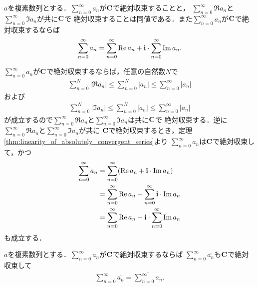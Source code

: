 	\begin{screen}
		\begin{thm}
		\label{thm:absolutely_convergent_series_is_sum_of_series_of_real_and_imaginary_part}
			$a$を複素数列とする．$\sum_{n=0}^\infty a_n$が$\mathbf{C}$で絶対収束することと，
			$\sum_{n=0}^\infty \Re{a_n}$と$\sum_{n=0}^\infty \Im{a_n}$が共に$\mathbf{C}$で
			絶対収束することは同値である．また$\sum_{n=0}^\infty a_n$が$\mathbf{C}$で絶対収束するならば
			\begin{align}
				\sum_{n=0}^\infty a_n = \sum_{n=0}^\infty \operatorname{Re} a_n + \mathbf{i} \cdot \sum_{n=0}^\infty \operatorname{Im} a_n.
			\end{align}
		\end{thm}
	\end{screen}
	
	\begin{sketch}
		$\sum_{n=0}^\infty a_n$が$\mathbf{C}$で絶対収束するならば，任意の自然数$N$で
		\begin{align}
			\sum_{n=0}^N |\Re{a_n}|
			\leq \sum_{n=0}^N |a_n|
			\leq \sum_{n=0}^\infty |a_n|
		\end{align}
		および
		\begin{align}
			\sum_{n=0}^N |\Im{a_n}|
			\leq \sum_{n=0}^N |a_n|
			\leq \sum_{n=0}^\infty |a_n|
		\end{align}
		が成立するので$\sum_{n=0}^\infty \Re{a_n}$と$\sum_{n=0}^\infty \Im{a_n}$は共に$\mathbf{C}$で
		絶対収束する．逆に$\sum_{n=0}^\infty \Re{a_n}$と$\sum_{n=0}^\infty \Im{a_n}$が共に
		$\mathbf{C}$で絶対収束するとき，定理\ref{thm:linearity_of_absolutely_convergent_series}より
		$\sum_{n=0}^\infty a_n$は$\mathbf{C}$で絶対収束して，かつ
		\begin{align}
			\sum_{n=0}^\infty a_n
			&= \sum_{n=0}^\infty (\operatorname{Re} a_n + \mathbf{i} \cdot \operatorname{Im} a_n) \\
			&= \sum_{n=0}^\infty \operatorname{Re} a_n + \sum_{n=0}^\infty \mathbf{i} \cdot \operatorname{Im} a_n\\
			&= \sum_{n=0}^\infty \operatorname{Re} a_n + \mathbf{i} \cdot \sum_{n=0}^\infty \operatorname{Im} a_n
		\end{align}
		も成立する．
		\QED
	\end{sketch}
	
	\begin{screen}
		\begin{thm}[絶体絶命する級数の共役は共役の級数に一致する]
		\label{thm:conjugate_of_absolutely_convergent_series_is_series_of_conjugate}
			$a$を複素数列とする．$\sum_{n=0}^\infty a_n$が$\mathbf{C}$で絶対収束するならば
			$\sum_{n=0}^\infty \overline{a_n}$も$\mathbf{C}$で絶対収束して
			\begin{align}
				\sum_{n=0}^\infty \overline{a_n} = \overline{\sum_{n=0}^\infty a_n}.
			\end{align}
		\end{thm}
	\end{screen}
	
